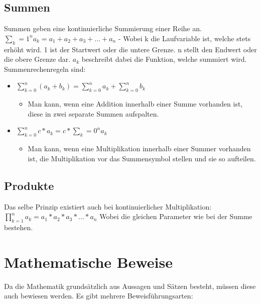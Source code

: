 \documentclass{article}
\begin{document}
	\subsection{Summen}
	Summen geben eine kontinuierliche Summierung einer Reihe an. \\
	$\sum_k=1^na_k = a_1+a_2+a_3+...+a_n$ - Wobei k die Laufvariable ist, welche stets erhöht wird. 1 ist der Startwert oder die untere Grenze. n stellt den Endwert oder die obere Grenze dar. $a_k$ beschreibt dabei die Funktion, welche summiert wird. \\
	Summenrechenregeln sind:
	\begin{itemize}
		\item{$\sum_{k=0}^{n}(a_k+b_k)=\sum_{k=0}^{n}a_k+\sum_{k=0}^{n}b_k$}
		\begin{itemize}
			\item{Man kann, wenn eine Addition innerhalb einer Summe vorhanden ist, diese in zwei separate Summen aufspalten.}
		\end{itemize}
		\item{$\sum_{k=0}^{n}c*a_k=c*\sum_k=0^na_k$}
		\begin{itemize}
			\item{Man kann, wenn eine Multiplikation innerhalb einer Summer vorhanden ist, die Multiplikation vor das Summensymbol stellen und sie so aufteilen.}
		\end{itemize}
	\end{itemize}
	\subsection{Produkte}
	Das selbe Prinzip existiert auch bei kontinuierlicher Multiplikation: \\
	$\prod_{k=1}^{n} a_k = a_1 * a_2 * a_3 * ... * a_n$ Wobei die gleichen Parameter wie bei der Summe bestehen.
	\section{Mathematische Beweise}
	\label{sec:Mathematische Beweise}
	Da die Mathematik grundsätzlich aus Aussagen und Sätzen besteht, müssen diese auch bewiesen werden. Es gibt mehrere Beweisführungsarten:
\end{document}
